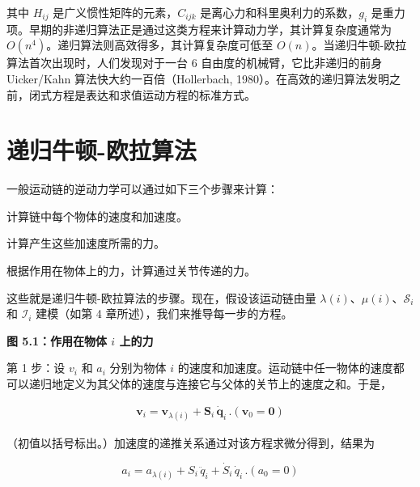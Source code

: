 \documentclass[10pt,a4paper]{book}
\theoremstyle{thmstyle} %
\theoremstyle{defstyle} %
\theoremstyle{prostyle} %
\begin{document}
其中 $H_{ij}$ 是广义惯性矩阵的元素，$C_{ijk}$ 是离心力和科里奥利力的系数，$g_i$ 是重力项。早期的非递归算法正是通过这类方程来计算动力学，其计算复杂度通常为 $O(n^4)$。递归算法则高效得多，其计算复杂度可低至 $O(n)$。当递归牛顿-欧拉算法首次出现时，人们发现对于一台 6 自由度的机械臂，它比非递归的前身 Uicker/Kahn 算法快大约一百倍（Hollerbach, 1980）。在高效的递归算法发明之前，闭式方程是表达和求值运动方程的标准方式。



\section{递归牛顿-欧拉算法}





一般运动链的逆动力学可以通过如下三个步骤来计算：



计算链中每个物体的速度和加速度。



计算产生这些加速度所需的力。



根据作用在物体上的力，计算通过关节传递的力。



这些就是递归牛顿-欧拉算法的步骤。现在，假设该运动链由量 $\lambda(i)$、$\mu(i)$、$\mathcal{S}_i$ 和 $\mathcal{I}_i$ 建模（如第 4 章所述），我们来推导每一步的方程。



\noindent\textbf{图 5.1：作用在物体 $i$ 上的力}





第 1 步：设 $v_i$ 和 $a_i$ 分别为物体 $i$ 的速度和加速度。运动链中任一物体的速度都可以递归地定义为其父体的速度与连接它与父体的关节上的速度之和。于是，



$$
\begin{array}{r} { \boldsymbol{ v } _ { i } = \boldsymbol{ v } _ { \lambda ( i ) } + \boldsymbol{ S } _ { i } \, \dot { \boldsymbol{ q } } _ { i } \, .  ( \boldsymbol{ v } _ { 0 } = \boldsymbol{ 0 } ) } \end{array}
$$



（初值以括号标出。）加速度的递推关系通过对该方程求微分得到，结果为



$$
a _ { i } = a _ { \lambda ( i ) } + S _ { i } \, \ddot { q } _ { i } + \dot { S } _ { i } \, \dot { q } _ { i } \, .  ( a _ { 0 } = 0 )
$$
\end{document}
